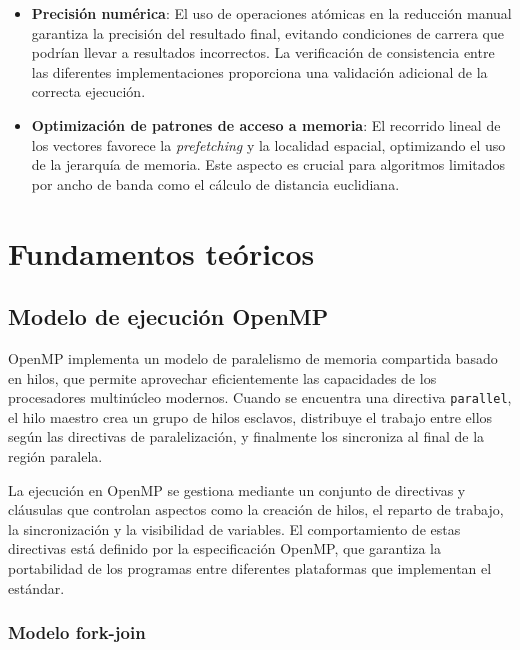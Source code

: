 \begin{itemize}
            \item \textbf{Precisión numérica}: El uso de operaciones atómicas en la reducción manual garantiza la precisión del resultado final, evitando condiciones de carrera que podrían llevar a resultados incorrectos. La verificación de consistencia entre las diferentes implementaciones proporciona una validación adicional de la correcta ejecución.
            
            \item \textbf{Optimización de patrones de acceso a memoria}: El recorrido lineal de los vectores favorece la \textit{prefetching} y la localidad espacial, optimizando el uso de la jerarquía de memoria. Este aspecto es crucial para algoritmos limitados por ancho de banda como el cálculo de distancia euclidiana.
            
        \end{itemize}

\newpage

\section{Fundamentos teóricos}

    \subsection{Modelo de ejecución OpenMP}

        OpenMP implementa un modelo de paralelismo de memoria compartida basado en hilos, que permite aprovechar eficientemente las capacidades de los procesadores multinúcleo modernos. Cuando se encuentra una directiva \texttt{parallel}, el hilo maestro crea un grupo de hilos esclavos, distribuye el trabajo entre ellos según las directivas de paralelización, y finalmente los sincroniza al final de la región paralela.
        
        La ejecución en OpenMP se gestiona mediante un conjunto de directivas y cláusulas que controlan aspectos como la creación de hilos, el reparto de trabajo, la sincronización y la visibilidad de variables. El comportamiento de estas directivas está definido por la especificación OpenMP, que garantiza la portabilidad de los programas entre diferentes plataformas que implementan el estándar.

        \subsubsection{Modelo fork-join}
        
